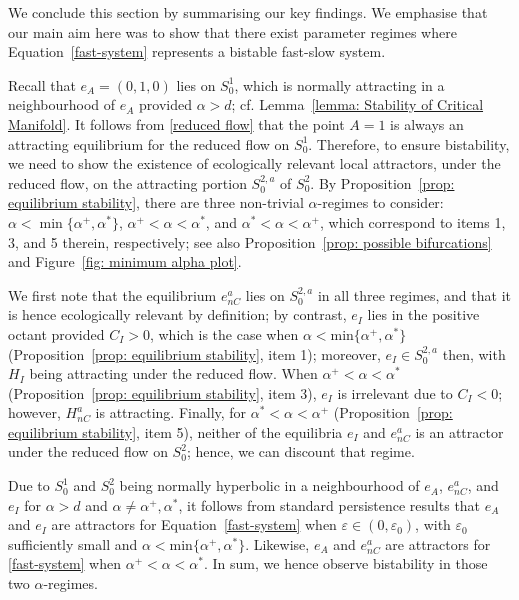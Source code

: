 \documentclass{article}
\theoremstyle{definition}
\numberwithin{equation}{section}
\begin{document}
We conclude this section by summarising our key findings. We emphasise that our main aim here was to show that there exist parameter regimes where Equation~\eqref{fast-system} represents a bistable fast-slow system. 

Recall that $e_A=(0,1,0)$ lies on $S_0^1$, which is normally attracting in a neighbourhood of $e_A$ provided $\alpha>d$; cf. Lemma~\ref{lemma: Stability of Critical Manifold}. It follows from \eqref{reduced flow} that the point $A=1$ is always an attracting equilibrium for the reduced flow on $S_0^1$. Therefore, to ensure bistability, we need to show the existence of ecologically relevant local attractors, under the reduced flow, on the attracting portion $S_0^{2,a}$ of $S_0^2$. By Proposition~\ref{prop: equilibrium stability}, there are three non-trivial $\alpha$-regimes to consider: $\alpha<\min\{\alpha^+, \alpha^{\ast}\}$, $\alpha^+<\alpha<\alpha^\ast$, and $\alpha^\ast<\alpha<\alpha^+$, which correspond to items 1, 3, and 5 therein, respectively; see also Proposition~\ref{prop: possible bifurcations} and Figure~\ref{fig: minimum alpha plot}.

We first note that the equilibrium $e_{nC}^a$ lies on $S_0^{2,a}$ in all three regimes, and that it is hence ecologically relevant by definition; by contrast, $e_I$ lies in the positive octant provided $C_I>0$, which is the case when $\alpha<\text{min}\{\alpha^+, \alpha^\ast\}$ (Proposition~\ref{prop: equilibrium stability}, item 1); moreover, $e_I\in S_0^{2,a}$ then, with $H_I$ being attracting under the reduced flow. When $\alpha^+<\alpha<\alpha^\ast$ (Proposition~\ref{prop: equilibrium stability}, item 3), $e_I$ is irrelevant due to $C_I<0$; however, $H_{nC}^a$ is attracting. Finally, for $\alpha^{\ast}<\alpha<\alpha^+$ (Proposition~\ref{prop: equilibrium stability}, item 5), neither of the equilibria $e_I$ and $e_{nC}^a$ is an attractor under the reduced flow on $S_0^2$; hence, we can discount that regime.

Due to $S_0^1$ and $S_0^2$ being normally hyperbolic in a neighbourhood of $e_A$, $e_{nC}^a$, and $e_I$ for $\alpha>d$ and $\alpha\neq \alpha^+,\alpha^\ast$, it follows from standard persistence results \cite[Theorem $3.1.4$]{MTSD} that $e_A$ and $e_I$ are attractors for Equation~\eqref{fast-system} when $\varepsilon\in(0, \varepsilon_0)$, with $\varepsilon_0$ sufficiently small and $\alpha<\text{min}\{\alpha^+, \alpha^\ast\}$. Likewise, $e_A$ and $e_{nC}^a$ are attractors for \eqref{fast-system} when $\alpha^+<\alpha<\alpha^\ast$. In sum, we hence observe bistability in those two $\alpha$-regimes.
\end{document}
